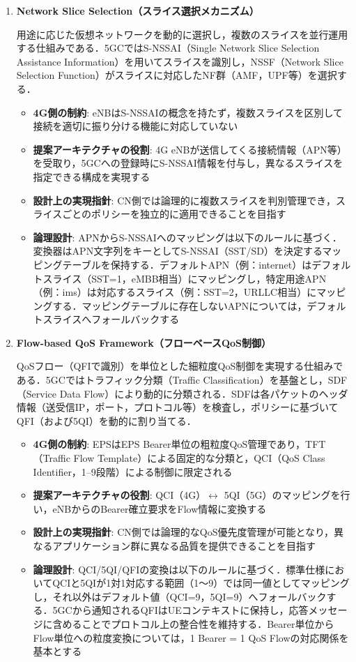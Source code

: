 \begin{enumerate}
\item \textbf{Network Slice Selection（スライス選択メカニズム）}

用途に応じた仮想ネットワークを動的に選択し，複数のスライスを並行運用する仕組みである．5GCではS-NSSAI（Single Network Slice Selection Assistance Information）を用いてスライスを識別し，NSSF（Network Slice Selection Function）がスライスに対応したNF群（AMF，UPF等）を選択する．

  \begin{itemize}
  \item \textbf{4G側の制約}: eNBはS-NSSAIの概念を持たず，複数スライスを区別して接続を適切に振り分ける機能に対応していない
  \item \textbf{提案アーキテクチャの役割}: 4G eNBが送信してくる接続情報（APN等）を受取り，5GCへの登録時にS-NSSAI情報を付与し，異なるスライスを指定できる構成を実現する
  \item \textbf{設計上の実現指針}: CN側では論理的に複数スライスを判別管理でき，スライスごとのポリシーを独立的に適用できることを目指す
  \item \textbf{論理設計}: APNからS-NSSAIへのマッピングは以下のルールに基づく．変換器はAPN文字列をキーとしてS-NSSAI（SST/SD）を決定するマッピングテーブルを保持する．デフォルトAPN（例：internet）はデフォルトスライス（SST=1，eMBB相当）にマッピングし，特定用途APN（例：ims）は対応するスライス（例：SST=2，URLLC相当）にマッピングする．マッピングテーブルに存在しないAPNについては，デフォルトスライスへフォールバックする
  \end{itemize}

\item \textbf{Flow-based QoS Framework（フローベースQoS制御）}

QoSフロー（QFIで識別）を単位とした細粒度QoS制御を実現する仕組みである．5GCではトラフィック分類（Traffic Classification）を基盤とし，SDF（Service Data Flow）により動的に分類される．SDFは各パケットのヘッダ情報（送受信IP，ポート，プロトコル等）を検査し，ポリシーに基づいてQFI（および5QI）を動的に割り当てる．

  \begin{itemize}
  \item \textbf{4G側の制約}: EPSはEPS Bearer単位の粗粒度QoS管理であり，TFT（Traffic Flow Template）による固定的な分類と，QCI（QoS Class Identifier，1--9段階）による制御に限定される
  \item \textbf{提案アーキテクチャの役割}: QCI（4G）$\leftrightarrow$ 5QI（5G）のマッピングを行い，eNBからのBearer確立要求をFlow情報に変換する
  \item \textbf{設計上の実現指針}: CN側では論理的なQoS優先度管理が可能となり，異なるアプリケーション群に異なる品質を提供できることを目指す
  \item \textbf{論理設計}: QCI/5QI/QFIの変換は以下のルールに基づく．標準仕様においてQCIと5QIが1対1対応する範囲（1〜9）では同一値としてマッピングし，それ以外はデフォルト値（QCI=9，5QI=9）へフォールバックする．5GCから通知されるQFIはUEコンテキストに保持し，応答メッセージに含めることでプロトコル上の整合性を維持する．Bearer単位からFlow単位への粒度変換については，1 Bearer = 1 QoS Flowの対応関係を基本とする
  \end{itemize}


\end{enumerate}
